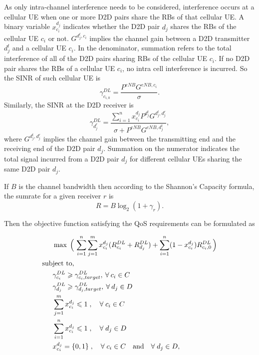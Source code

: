 \documentclass[times]{dacauth}
\begin{document}
\smallskip
\noindent
As only intra-channel interference needs to be considered, interference occurs at a cellular UE when one or more D2D pairs share the RBs of that cellular UE. A binary variable $x_{c_i}^{d_j}$ indicates whether the D2D pair $d_j$  shares the RBs of the cellular UE $c_i$ or not. $G^{d_j^t,c_i}$ implies the channel gain between a D2D transmitter $d_j^t$ and a cellular UE $c_i$. In the denominator, summation refers to the total interference of all of the D2D pairs sharing RBs of the cellular UE $c_i$. 
If no D2D pair shares the RBs of a cellular UE $c_i$, no intra cell interference is incurred. So the SINR of such cellular UE is
 \begin{equation}\label{eqn:sinr_c0}
 \gamma_{c_{i,0}}^{DL} = \frac{P^{eNB}G^{eNB,c_i}}{\sigma}.
 \end{equation} Similarly, the SINR at the D2D receiver \cite{zulhasnine} is
\begin{equation}\label{eqn:sinr_d}
 \gamma_{d_j^r}^{DL} = \frac{\sum_{i=1}^{n} x_{c_i}^{d_j}P^{d_j^t}G^{{d_j^t},d_j^r}}{\sigma + P^{ eNB}G^{ eNB,d_j^t}},
\end{equation}
where $G^{d_j^t,d_j^r}$ implies the channel gain between the transmitting end and the receiving end of the D2D pair $d_j$. Summation on the numerator indicates the total signal incurred from a D2D pair $d_j$ for different cellular UEs sharing the same D2D pair $d_j$.

\smallskip
\noindent
If $B$ is the channel bandwidth then according to the Shannon's Capacity formula, the sumrate for a given receiver $r$ is 
\begin{equation}
	R = B\log_{2}(1+\gamma_{ r}). 
\end{equation}

\noindent
Then the objective function satisfying the QoS requirements can be formulated as 

\begin{align}
&\max \; \Big(\, \sum_{i=1}^{n}\sum_{j=1}^{m} x_{c_i}^{d_j} (R_{c_i}^{DL}+R_{d_j}^{DL}) + \sum_{i=1}^{n}(1-x_{c_i}^{d_j}) R_{c_i,0}^{DL}\, \Big) \label{eqn:objective} \\
\text{sub}&\text{ject}\text{ to,}\notag\\
&\gamma_{c_i}^{DL} \geqslant \gamma_{c_i,target}^{DL}, \: \forall \:c_i\in C \label{eqn:constraintC} \\
&\gamma_{d_j}^{DL} \geqslant \gamma_{d_j,target}^{DL}, \: \forall \:d_j\in D \label{eqn:constraintD}\\
&\sum_{j=1}^{m}x_{c_i}^{d_j} \leqslant 1\;,\quad \forall \;c_i \in C \label{eqn:constraintxc}\\
&\sum_{i=1}^{n}x_{c_i}^{d_j} \leqslant 1\;,\quad \forall \;d_j \in D \label{eqn:constraintxd}\\
&x_{c_i}^{d_j} = \{0,1\}\;,  		 \quad \forall \;c_i \in C \quad  \text{and} \quad \forall \;d_j \in D, \label{eqn:constraintx}
\end{align}
\end{document}
